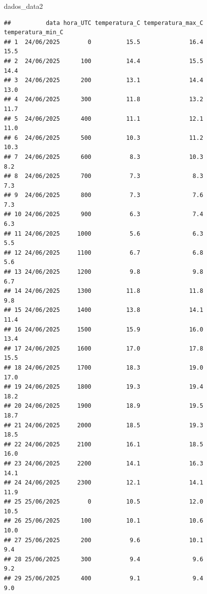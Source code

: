 \documentclass[
]{article}
\newenvironment{Shaded}{\begin{snugshade}}{\end{snugshade}}
\newcommand{\NormalTok}[1]{#1}
\begin{document}
\begin{Shaded}
\begin{Highlighting}[]
\NormalTok{dados\_data2}
\end{Highlighting}
\end{Shaded}

\begin{verbatim}
##          data hora_UTC temperatura_C temperatura_max_C temperatura_min_C
## 1  24/06/2025        0          15.5              16.4              15.5
## 2  24/06/2025      100          14.4              15.5              14.4
## 3  24/06/2025      200          13.1              14.4              13.0
## 4  24/06/2025      300          11.8              13.2              11.7
## 5  24/06/2025      400          11.1              12.1              11.0
## 6  24/06/2025      500          10.3              11.2              10.3
## 7  24/06/2025      600           8.3              10.3               8.2
## 8  24/06/2025      700           7.3               8.3               7.3
## 9  24/06/2025      800           7.3               7.6               7.3
## 10 24/06/2025      900           6.3               7.4               6.3
## 11 24/06/2025     1000           5.6               6.3               5.5
## 12 24/06/2025     1100           6.7               6.8               5.6
## 13 24/06/2025     1200           9.8               9.8               6.7
## 14 24/06/2025     1300          11.8              11.8               9.8
## 15 24/06/2025     1400          13.8              14.1              11.4
## 16 24/06/2025     1500          15.9              16.0              13.4
## 17 24/06/2025     1600          17.0              17.8              15.5
## 18 24/06/2025     1700          18.3              19.0              17.0
## 19 24/06/2025     1800          19.3              19.4              18.2
## 20 24/06/2025     1900          18.9              19.5              18.7
## 21 24/06/2025     2000          18.5              19.3              18.5
## 22 24/06/2025     2100          16.1              18.5              16.0
## 23 24/06/2025     2200          14.1              16.3              14.1
## 24 24/06/2025     2300          12.1              14.1              11.9
## 25 25/06/2025        0          10.5              12.0              10.5
## 26 25/06/2025      100          10.1              10.6              10.0
## 27 25/06/2025      200           9.6              10.1               9.4
## 28 25/06/2025      300           9.4               9.6               9.2
## 29 25/06/2025      400           9.1               9.4               9.0

\end{verbatim}
\end{document}
